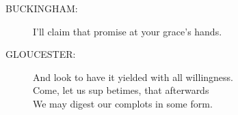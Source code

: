 \documentclass{article}
\begin{document}
\begin{description}
\item[BUCKINGHAM:] 
\hspace{1pt}I'll claim that promise at your grace's hands.\\
\end{description}
\begin{description}
\item[GLOUCESTER:] 
\hspace{1pt}And look to have it yielded with all willingness.\\
\hspace{1pt}Come, let us sup betimes, that afterwards\\
\hspace{1pt}We may digest our complots in some form.\\
\end{description}
\centering{\it [Exeunt]}\\
\end{document}

